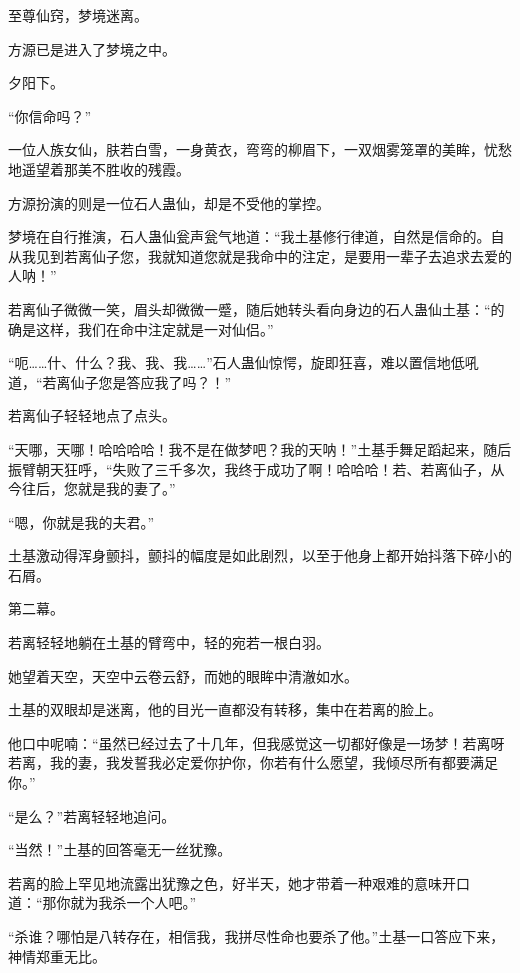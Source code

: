 
\begin{this_body}



至尊仙窍，梦境迷离。

方源已是进入了梦境之中。

夕阳下。

“你信命吗？”

一位人族女仙，肤若白雪，一身黄衣，弯弯的柳眉下，一双烟雾笼罩的美眸，忧愁地遥望着那美不胜收的残霞。

方源扮演的则是一位石人蛊仙，却是不受他的掌控。

梦境在自行推演，石人蛊仙瓮声瓮气地道：“我土基修行律道，自然是信命的。自从我见到若离仙子您，我就知道您就是我命中的注定，是要用一辈子去追求去爱的人呐！”

若离仙子微微一笑，眉头却微微一蹙，随后她转头看向身边的石人蛊仙土基：“的确是这样，我们在命中注定就是一对仙侣。”

“呃……什、什么？我、我、我……”石人蛊仙惊愕，旋即狂喜，难以置信地低吼道，“若离仙子您是答应我了吗？！”

若离仙子轻轻地点了点头。

“天哪，天哪！哈哈哈哈！我不是在做梦吧？我的天呐！”土基手舞足蹈起来，随后振臂朝天狂呼，“失败了三千多次，我终于成功了啊！哈哈哈！若、若离仙子，从今往后，您就是我的妻了。”

“嗯，你就是我的夫君。”

土基激动得浑身颤抖，颤抖的幅度是如此剧烈，以至于他身上都开始抖落下碎小的石屑。

第二幕。

若离轻轻地躺在土基的臂弯中，轻的宛若一根白羽。

她望着天空，天空中云卷云舒，而她的眼眸中清澈如水。

土基的双眼却是迷离，他的目光一直都没有转移，集中在若离的脸上。

他口中呢喃：“虽然已经过去了十几年，但我感觉这一切都好像是一场梦！若离呀若离，我的妻，我发誓我必定爱你护你，你若有什么愿望，我倾尽所有都要满足你。”

“是么？”若离轻轻地追问。

“当然！”土基的回答毫无一丝犹豫。

若离的脸上罕见地流露出犹豫之色，好半天，她才带着一种艰难的意味开口道：“那你就为我杀一个人吧。”

“杀谁？哪怕是八转存在，相信我，我拼尽性命也要杀了他。”土基一口答应下来，神情郑重无比。


\end{this_body}
